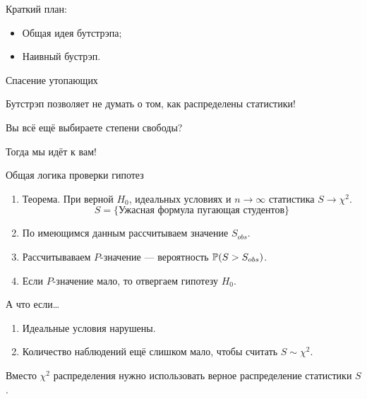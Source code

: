 
\begin{frame} %


\end{frame}



\begin{frame}{Краткий план:}
  \begin{itemize}[<+->]
    \item Общая идея бутстрэпа;
    \item Наивный бустрэп.
  \end{itemize}

\end{frame}


\begin{frame}{Спасение утопающих}

  \alert{Бутстрэп} позволяет не думать о том, как распределены статистики!
  
  \pause

  Вы всё ещё выбираете степени свободы? 
  
  \pause
  
  Тогда мы идёт к вам! 
\end{frame}

\begin{frame}{Общая логика проверки гипотез}

\begin{enumerate}[<+->]
  \item Теорема. При верной $H_0$, \alert{идеальных условиях} и \alert{$n\to\infty$} статистика $S \to \chi^2$.
  \[
  S = \{ \text{Ужасная формула пугающая студентов}\}  
  \]
  \item По имеющимся данным рассчитываем значение $S_{obs}$.
  \item Рассчитываваем $P$-значение — вероятность $\P(S > S_{obs})$.
  \item Если $P$-значение мало, то отвергаем гипотезу $H_0$.
\end{enumerate}

\end{frame}

\begin{frame}{А что если\ldots}

  \begin{enumerate}[<+->]
    \item \alert{Идеальные условия} нарушены.
    \item Количество наблюдений ещё слишком мало, чтобы считать $S \sim \chi^2$.
  \end{enumerate}
  
  Вместо $\chi^2$ распределения нужно использовать \alert{верное} распределение статистики $S$.

\end{frame}


